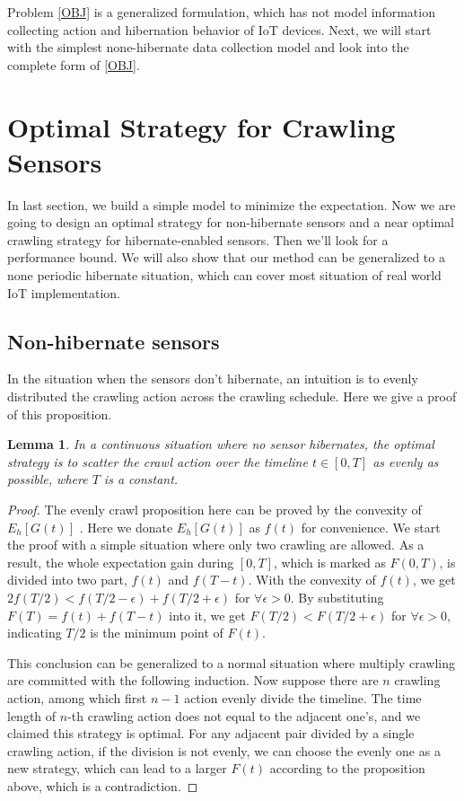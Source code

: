 \documentclass[conference]{IEEEtran}
\newtheorem{lemma}{Lemma}
\begin{document}
Problem \eqref{OBJ} is a generalized formulation, which has not model information collecting action and hibernation behavior of IoT devices. Next, we will start with the simplest none-hibernate data collection model and look into the complete form of \eqref{OBJ}.

\section{Optimal Strategy for Crawling Sensors}

In last section, we build a simple model to minimize the expectation. Now we are going to design an optimal strategy for non-hibernate sensors and a near optimal crawling strategy for hibernate-enabled sensors. Then we'll look for a performance bound. We will also show that our method can be generalized to a none periodic hibernate situation, which can cover most situation of real world IoT implementation. 

\subsection{Non-hibernate sensors}

In the situation when the sensors don't hibernate, an intuition is to evenly distributed the crawling action across the crawling schedule. Here we give a proof of this proposition.

\begin{lemma}
\label{evenly}
In a continuous situation where no sensor hibernates, the optimal strategy is to scatter the crawl action over the timeline $t\in [0, T]$ as evenly as possible, where $T$ is a constant.
\end{lemma}

\begin{proof}
The evenly crawl proposition here can be proved by the convexity of $E_h[G(t)]$ \cite{boyd2004convex}. Here we donate $E_h[G(t)]$ as $f(t)$ for convenience. 
We start the proof with a simple situation where only two crawling are allowed. 
As a result, the whole expectation gain during $[0,T]$, which is marked as $F(0, T)$, is divided into two part, $f(t)$ and $f(T-t)$. With the convexity of $f(t)$, we get $2f(T/2)<f(T/2-\epsilon)+f(T/2+\epsilon)$ for $\forall{\epsilon>0}$. By substituting $F(T)=f(t)+f(T-t)$ into it, we get $F(T/2)<F(T/2+\epsilon)$ for $\forall{\epsilon>0}$, indicating $T/2$ is the minimum point of $F(t)$.


This conclusion can be generalized to a normal situation where multiply crawling are committed with the following induction. 
Now suppose there are $n$ crawling action, among which first $n-1$ action evenly divide the timeline. The time length of $n$-th crawling action does not equal to the adjacent one's, and we claimed this strategy is optimal. For any adjacent pair divided by a single crawling action, if the division is not evenly, we can choose the evenly one as a new strategy, which can lead to a larger $F(t)$ according to the proposition above, which is a contradiction.
\end{proof}
\end{document}
